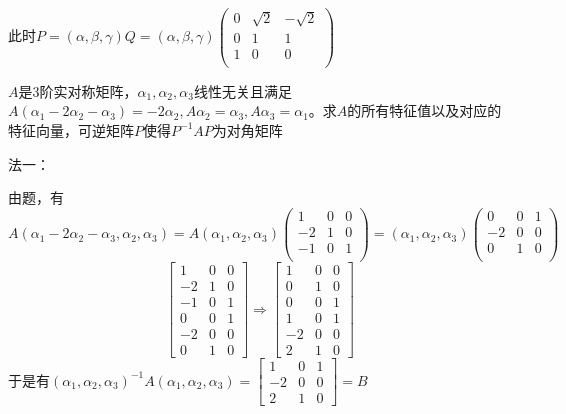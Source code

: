 \documentclass[lang=cn,10pt]{elegantbook}
\begin{document}
\begin{solution}
此时$P=\left( \alpha ,\beta ,\gamma \right)Q=\left( \alpha ,\beta ,\gamma \right)\left( \begin{matrix}
	0&		\sqrt{2}&		-\sqrt{2}\\
	0&		1&		1\\
	1&		0&		0\\
\end{matrix} \right) $
\end{solution}
\begin{example}
	$A$是3阶实对称矩阵，$\alpha _1,\alpha _2,\alpha _3$线性无关且满足$A(\alpha _1-2\alpha _2-\alpha _3)=-2\alpha _2,A\alpha _2=\alpha _3 ,A\alpha _3=\alpha _1$。求$A$的所有特征值以及对应的特征向量，可逆矩阵$P$使得$P^{-1}AP$为对角矩阵
\end{example}
\begin{solution}
	
	法一：
	
	由题，有
	\begin{equation*}
		A\left( \alpha _1-2\alpha _2-\alpha _3,\alpha _2,\alpha _3 \right) =A\left( \alpha _1,\alpha _2,\alpha _3 \right) \left( \begin{matrix}
			1&		0&		0\\
			-2&		1&		0\\
			-1&		0&		1\\
		\end{matrix} \right) =\left( \alpha _1,\alpha _2,\alpha _3 \right) \left( \begin{matrix}
			0&		0&		1\\
			-2&		0&		0\\
			0&		1&		0\\
		\end{matrix} \right) 
	\end{equation*}
	\begin{equation*}
		\begin{bmatrix}
			1& 0 &0 \\
			-2&1  &0 \\
			-1&0  &1 \\
			0&0  & 1\\
			-2& 0 &0 \\
			0 & 1 &0
		\end{bmatrix}\Longrightarrow \begin{bmatrix}
			1& 0 &0 \\
			0&1  &0 \\
			0&0  &1 \\
			1&0  & 1\\
			-2& 0 &0 \\
			2 & 1 &0
		\end{bmatrix}
	\end{equation*}
	于是有$\left( \alpha _1,\alpha _2,\alpha _3 \right)^{-1}A\left( \alpha _1,\alpha _2,\alpha _3 \right)=\begin{bmatrix}
		1&0  & 1\\
		-2& 0 &0 \\
		2 & 1 &0
	\end{bmatrix}=B$
	

\end{solution}
\end{document}
